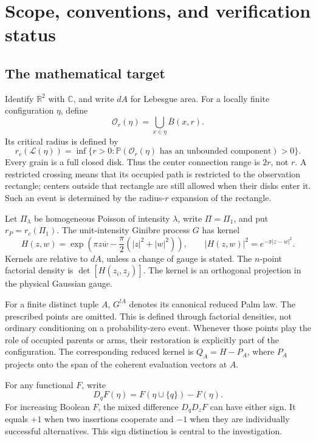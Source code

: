 \documentclass[11pt,a4paper]{article}
\theoremstyle{definition}
\theoremstyle{remark}
\numberwithin{equation}{section}
\begin{document}
\tableofcontents
\clearpage

\section*{Scope, conventions, and verification status}

\subsection*{The mathematical target}
Identify \(\mathbb R^2\) with \(\mathbb C\), and write \(dA\) for Lebesgue
area. For a locally finite configuration \(\eta\), define
\[
 \mathcal O_r(\eta)=\bigcup_{x\in\eta}\overline B(x,r).
\]
Its critical radius is defined by
\[
 r_c(\mathcal L(\eta))=
 \inf\{r>0:\mathbb P(\mathcal O_r(\eta)
           \text{ has an unbounded component})>0\}.
\]
Every grain is a full closed disk. Thus the center connection range is
\(2r\), not \(r\). A restricted crossing means that its occupied path is
restricted to the observation rectangle; centers outside that rectangle
are still allowed when their disks enter it. Such an event is determined
by the radius-\(r\) expansion of the rectangle.

Let \(\Pi_\lambda\) be homogeneous Poisson of intensity \(\lambda\),
write \(\Pi=\Pi_1\), and put \(r_P=r_c(\Pi_1)\).
The unit-intensity Ginibre process \(G\) has kernel
\[
 H(z,w)=\exp\!\left(\pi z\overline w
                -\frac\pi2(|z|^2+|w|^2)\right),
 \qquad |H(z,w)|^2=e^{-\pi|z-w|^2}.
\]
Kernels are relative to \(dA\), unless a change of gauge is stated.
The \(n\)-point factorial density is \(\det[H(z_i,z_j)]\).
The kernel is an orthogonal projection in the physical Gaussian gauge.

For a finite distinct tuple \(A\), \(G^{!A}\) denotes its canonical
reduced Palm law. The prescribed points are omitted. This is defined
through factorial densities, not ordinary conditioning on a probability-zero
event. Whenever those points play the role of occupied parents or arms,
their restoration is explicitly part of the configuration. The corresponding
reduced kernel is \(Q_A=H-P_A\), where \(P_A\) projects onto the span of
the coherent evaluation vectors at \(A\).

For any functional \(F\), write
\[
 D_qF(\eta)=F(\eta\cup\{q\})-F(\eta).
\]
For increasing Boolean \(F\), the mixed difference \(D_qD_zF\) can have
either sign. It equals \(+1\) when two insertions cooperate and \(-1\)
when they are individually successful alternatives. This sign distinction
is central to the investigation.
\end{document}
